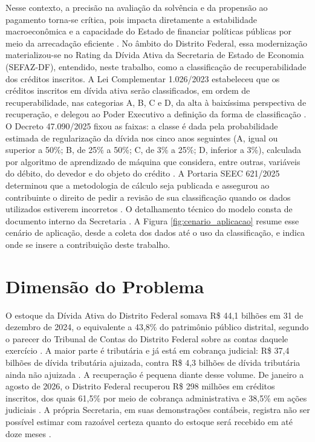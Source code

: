 Nesse contexto, a precisão na avaliação da solvência e da propensão ao pagamento torna-se crítica, pois impacta diretamente a estabilidade macroeconômica e a capacidade do Estado de financiar políticas públicas por meio da arrecadação eficiente \cite{zouInterpretableCreditScoring2025}. No âmbito do Distrito Federal, essa modernização materializou-se no Rating da Dívida Ativa da Secretaria de Estado de Economia (SEFAZ-DF), entendido, neste trabalho, como a classificação de recuperabilidade dos créditos inscritos. A Lei Complementar \textnumero{} 1.026/2023 estabeleceu que os créditos inscritos em dívida ativa serão classificados, em ordem de recuperabilidade, nas categorias A, B, C e D, da alta à baixíssima perspectiva de recuperação, e delegou ao Poder Executivo a definição da forma de classificação \cite{distritofederalLC10262023}. O Decreto \textnumero{} 47.090/2025 fixou as faixas: a classe é dada pela probabilidade estimada de regularização da dívida nos cinco anos seguintes (A, igual ou superior a 50\%; B, de 25\% a 50\%; C, de 3\% a 25\%; D, inferior a 3\%), calculada por algoritmo de aprendizado de máquina que considera, entre outras, variáveis do débito, do devedor e do objeto do crédito \cite{distritofederalDecreto470902025}. A Portaria SEEC \textnumero{} 621/2025 determinou que a metodologia de cálculo seja publicada e assegurou ao contribuinte o direito de pedir a revisão de sua classificação quando os dados utilizados estiverem incorretos \cite{distritofederalPortaria6212025}. O detalhamento técnico do modelo consta de documento interno da Secretaria \cite{sefazdf2025rating}. A Figura \ref{fig:cenario_aplicacao} resume esse cenário de aplicação, desde a coleta dos dados até o uso da classificação, e indica onde se insere a contribuição deste trabalho.



\section{Dimensão do Problema}

O estoque da Dívida Ativa do Distrito Federal somava R\$ 44,1 bilhões em 31 de dezembro de 2024, o equivalente a 43,8\% do patrimônio público distrital, segundo o parecer do Tribunal de Contas do Distrito Federal sobre as contas daquele exercício \cite{seecTCDFContas2024}. A maior parte é tributária e já está em cobrança judicial: R\$ 37,4 bilhões de dívida tributária ajuizada, contra R\$ 4,3 bilhões de dívida tributária ainda não ajuizada \cite{distritofederalBalanco2024}. A recuperação é pequena diante desse volume. De janeiro a agosto de 2026, o Distrito Federal recuperou R\$ 298 milhões em créditos inscritos, dos quais 61,5\% por meio de cobrança administrativa e 38,5\% em ações judiciais \cite{agenciabrasilia2026recuperados}. A própria Secretaria, em suas demonstrações contábeis, registra não ser possível estimar com razoável certeza quanto do estoque será recebido em até doze meses \cite{distritofederalBalanco2024}.

